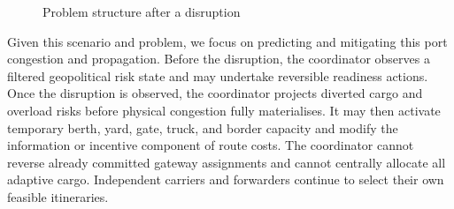 \documentclass[a4paper,fleqn]{cas-sc}
\begin{document}
\begin{figure}
\caption{Problem structure after a disruption}
\label{fig:hormuz-structure}
\end{figure}


Given this scenario and problem, we focus on predicting and mitigating this port congestion and propagation. Before the
disruption, the coordinator observes a filtered geopolitical risk state and
may undertake reversible readiness actions. Once the disruption is observed,
the coordinator projects diverted cargo and overload risks before physical
congestion fully materialises. It may then activate temporary berth, yard,
gate, truck, and border capacity and modify the information or incentive
component of route costs. The coordinator cannot reverse already committed
gateway assignments and cannot centrally allocate all adaptive cargo.
Independent carriers and forwarders continue to select their own feasible
itineraries.
\end{document}
